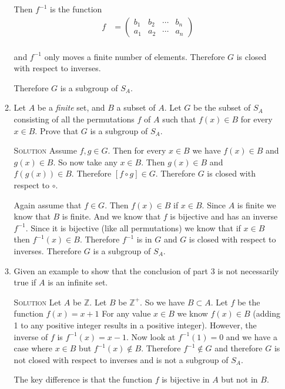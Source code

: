 \documentclass[twoside]{amsart}
\newcommand{\Integers}{\ensuremath{\mathbb{Z}{}}\xspace}
\newcommand{\solution}{\textsc{Solution}\xspace}
\begin{document}
\begin{enumerate}[A.]
\begin{enumerate}[1]
	 Then $f^{-1}$ is the function
	 \begin{align*}
	    f & = \begin{pmatrix}
		      b_1 & b_2 & \cdots & b_n \\
		      a_1 & a_2 & \cdots & a_n  
		  \end{pmatrix} \\
	 \end{align*}

	 and $f^{-1}$ only moves a finite number of elements. Therefore
	 $G$ is closed with respect to inverses.

	 \hspace{.15in}Therefore $G$ is a subgroup of $S_A$.

	 \item Let $A$ be a \emph{finite} set, and $B$ a subset of $A$.
	 Let $G$ be the subset of $S_A$ consisting of all the permutations 
	 $f$ of $A$ such that $f(x) \in B$ for every $x \in B$. Prove that
	 $G$ is a subgroup of $S_A$.

	 \solution Assume $f,g \in G$. Then for every $x \in B$ we have
	 $f(x) \in B$ and $g(x) \in B$. So now take any $x \in B$.
	 Then $g(x) \in B$ and $f(g(x)) \in B$. Therefore $[f \circ g] \in G$.
	 Therefore $G$ is closed with respect to $\circ$.
	 
	 Again assume that $f \in G$. Then $f(x) \in B$ if $x \in B$.
	 Since $A$ is finite we know that $B$ is finite. And we know that
	 $f$ is bijective and has an inverse $f^{-1}$. Since it is bijective
	 (like all permutations) we know that
	 if $x \in B$ then $f^{-1}(x) \in B$.
	 Therefore $f^{-1}$ is in $G$
	 and $G$ is closed with respect to inverses. Therefore $G$ is
	 a subgroup of $S_A$.
         

	 \item Given an example to show that the conclusion of part 3
	 is not necessarily true if $A$ is an infinite set.

	 \solution Let $A$ be \Integers. Let $B$ be $\Integers^+$. So
	 we have $B \subset A$. Let $f$ be the function $f(x) = x + 1$
	 For any value $x \in B$ we know $f(x) \in B$ (adding 1 to any
	 positive integer results in a positive integer). However, the inverse
	 of $f$ is $f^{-1}(x) = x - 1$. Now look at $f^{-1}(1) = 0$ and
	 we have a case where $x \in B$ but $f^{-1}(x) \notin B$.
	 Therefore $f^{-1} \notin G$ and therefore $G$ is not closed
	 with respect to inverses and is not a subgroup of $S_A$.


	 The key difference is that the function $f$ is bijective in $A$
	 but not in $B$.

	    

      \end{enumerate}
 
\end{enumerate}
\end{document}
